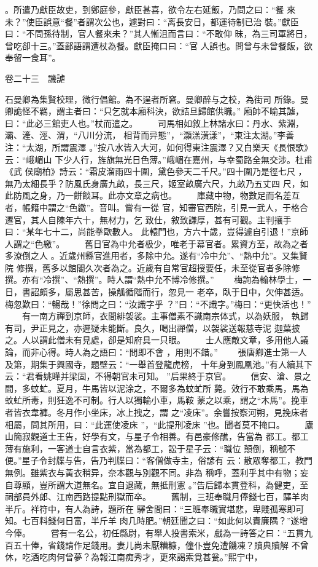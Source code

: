 \documentclass{ctexart}
\begin{document}
。所遣乃獻臣故吏，到鄭庭參，獻臣甚喜，欲令左右延飯，乃問之曰：``餐 來未？''使臣誤意``餐''者謂次公也，遽對曰：``离長安日，都運待制已治 裝。''獻臣曰：``不問孫待制，官人餐來未？''其人慚沮而言曰：``不敢仰 昧，為三司軍將日，曾吃卻十三。''蓋鄙語謂遭杖為餐。獻臣掩口曰：``官 人誤也。問曾与未曾餐飯，欲奉留一食耳''。

卷二十三　譏謔

石曼卿為集賢校理，微行倡館。為不逞者所窘。曼卿醉与之校，為街司 所錄。曼卿詭怪不羈，謂主者曰：``只乞就本廂科決，欲詰旦歸館供職。'' 廂帥不喻其謔，曰：``此必三館吏人也。''杖而遣之。 　　司馬相如敘上林諸水曰：丹水、紫淵，灞、滻、涇、渭，``八川分流， 相背而异態''，``灝溔潢漾''，``東注太湖。''李善注：``太湖，所謂震澤 。''按八水皆入大河，如何得東注震澤？又白樂天《長恨歌》云：``峨嵋山 下少人行，旌旗無光日色薄。''峨嵋在嘉州，与幸蜀路全無交涉。杜甫《武 侯廟柏》詩云：``霜皮溜雨四十圍，黛色參天二千尺。''四十圍乃是徑七尺 ，無乃太細長乎？防風氏身廣九畝，長三尺，姬室畝廣六尺，九畝乃五丈四 尺，如此防風之身，乃一餅餤耳。此亦文章之病也。 　　庫藏中物，物數足而名差互者，帳籍中謂之``色繳''。音叫。嘗有一從 官，知審官西院，引見一武人，于格合遷官，其人自陳年六十，無材力，乞 致仕，敘致謙厚，甚有可觀。主判攘手曰：``某年七十二，尚能拳歐數人。 此轅門也，方六十歲，豈得遽自引退！''京師人謂之``色繳''。 　　舊日官為中允者极少，唯老于幕官者。累資方至，故為之者多潦倒之人 。近歲州縣官進用者，多除中允。遂有``冷中允''、``熱中允''。又集賢院 修撰，舊多以館閣久次者為之。近歲有自常官超授要任，未至從官者多除修 撰。亦有``冷撰''、``熱撰''。時人謂``熱中允不博冷修撰。'' 　　梅詢為翰林學士，一日，書詔頗多，屬思甚苦，操觚循階而行，忽見一 老卒，臥于日中，欠伸甚适。梅忽歎曰：``暢哉！''徐問之曰：``汝識字乎 ？''曰：``不識字。''梅曰：``更快活也！'' 　　有一南方禪到京師，衣間緋袈裟。主事僧素不識南宗体式，以為妖服， 執歸有司，尹正見之，亦遲疑未能斷。良久，喝出禪僧，以袈裟送報慈寺泥 迦葉披之。人以謂此僧未有見處，卻是知府具一只眼。 　　士人應敵文章，多用他人議論，而非心得。時人為之語曰：``問即不會 ，用則不錯。'' 　　張唐卿進士第一人及第，期集于興國寺，題壁云：``一舉首登龍虎榜， 十年身到鳳凰池。''有人續其下云：``君看姚曄并梁固，不得朝官未可知。 ''后果終于京官。 　　信安、滄、景之間，多蚊虻。夏月，牛馬皆以泥涂之，不爾多為蚊虻所 斃。效行不敢乘馬，馬為蚊虻所毒，則狂逸不可制。行人以獨輪小車，馬鞍 蒙之以乘，謂之``木馬''。挽車者皆衣韋褲。冬月作小坐床，冰上拽之，謂 之``凌床''。余嘗按察河朔，見挽床者相屬，問其所用，曰：``此運使凌床 ''，``此提刑凌床 ''也。聞者莫不掩口。 　　廬山簡寂觀道士王告，好學有文，与星子令相善。有邑豪修醮，告當為 都工。都工薄有施利，一客道士自言衣紫，當為都工，訟于星子云：``職位 顛倒，稱號不便。''星子令封牒与告，告乃判牒曰：``客僧做寺主，俗諺有 云：散眾奪都工，教門無例。雖紫衣与黃衣稍异，奈本觀与別觀不同。非為 稱呼，蓋利乎其中有物；妄自尊顯，豈所謂大道無名。宜自退藏，無抵刑憲 。''告后歸本貫登科，為健吏，至祠部員外郎、江南西路提點刑獄而卒。 　　舊制，三班奉職月俸錢七百，驛羊肉半斤。祥符中，有人為詩，題所在 驛舍間曰：``三班奉職實堪悲，卑賤孤寒即可知。七百料錢何日富，半斤羊 肉几時肥。''朝廷聞之曰：``如此何以責廉隅？''遂增今俸。 　　嘗有一名公，初任縣尉，有舉人投書索米，戲為一詩答之曰：``五貫九 百五十俸，省錢請作足錢用。妻儿尚未厭糟糠，僮仆豈免遭饑凍？贖典贖解 不曾休，吃酒吃肉何曾夢？為報江南痴秀才，更來謁索覓甚瓮。''熙宁中， 
\end{document}
